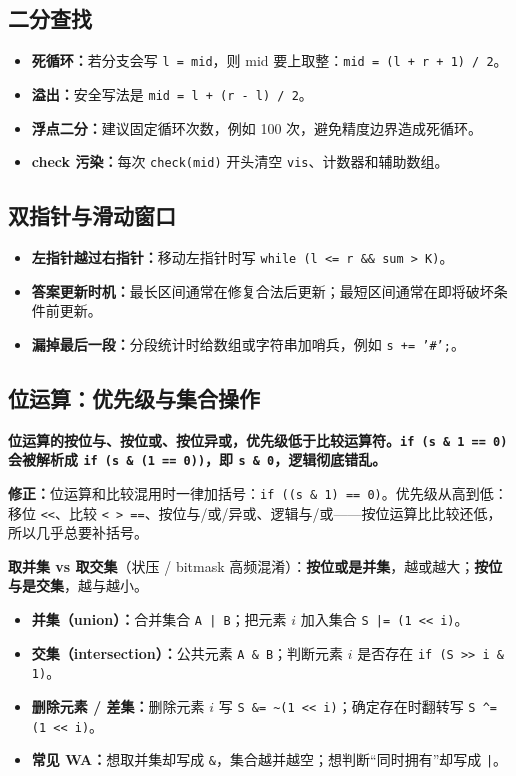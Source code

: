 \documentclass[UTF8,openany,oneside,zihao=-4]{ctexbook}
\newcommand{\risk}[1]{%
  \vspace{0.35em}
  \noindent\colorbox{softred}{%
    \parbox{\dimexpr\linewidth-2\fboxsep}{\textcolor{danger}{\textbf{#1}}}}%
  \vspace{0.35em}
}
\newcommand{\note}[1]{%
  \vspace{0.35em}
  \noindent\colorbox{softblue}{%
    \parbox{\dimexpr\linewidth-2\fboxsep}{\textcolor{ink}{#1}}}%
  \vspace{0.35em}
}
\newcommand{\fix}[1]{%
  \vspace{0.35em}
  \noindent\colorbox{softgreen}{%
    \parbox{\dimexpr\linewidth-2\fboxsep}{\textbf{修正：}#1}}%
  \vspace{0.35em}
}
\newcommand{\term}[1]{\textbf{\textcolor{accenttwo}{#1}}}
\begin{document}
\subsection{二分查找}

\begin{itemize}
  \item \textbf{死循环：}若分支会写 \lstinline!l = mid!，则 mid 要上取整：\lstinline!mid = (l + r + 1) / 2!。
  \item \textbf{溢出：}安全写法是 \lstinline!mid = l + (r - l) / 2!。
  \item \textbf{浮点二分：}建议固定循环次数，例如 100 次，避免精度边界造成死循环。
  \item \textbf{check 污染：}每次 \lstinline!check(mid)! 开头清空 \lstinline!vis!、计数器和辅助数组。
\end{itemize}

\subsection{双指针与滑动窗口}

\begin{itemize}
  \item \textbf{左指针越过右指针：}移动左指针时写 \texttt{while (l <= r \&\& sum > K)}。
  \item \textbf{答案更新时机：}最长区间通常在修复合法后更新；最短区间通常在即将破坏条件前更新。
  \item \textbf{漏掉最后一段：}分段统计时给数组或字符串加哨兵，例如 \texttt{s += '\#';}。
\end{itemize}

\subsection{位运算：优先级与集合操作}

\risk{位运算的按位与、按位或、按位异或，优先级\textbf{低于}比较运算符。\texttt{if (s \& 1 == 0)} 会被解析成 \texttt{if (s \& (1 == 0))}，即 \texttt{s \& 0}，逻辑彻底错乱。}

\fix{位运算和比较混用时一律加括号：\texttt{if ((s \& 1) == 0)}。优先级从高到低：移位 \texttt{<<}、比较 \texttt{< > ==}、按位与/或/异或、逻辑与/或——按位运算比比较还低，所以几乎总要补括号。}

\note{\textbf{取并集 vs 取交集}（状压 / bitmask 高频混淆）：\term{按位或是并集}，越或越大；\term{按位与是交集}，越与越小。}

\begin{itemize}
  \item \textbf{并集（union）：}合并集合 \lstinline!A | B!；把元素 $i$ 加入集合 \lstinline!S |= (1 << i)!。
  \item \textbf{交集（intersection）：}公共元素 \lstinline!A & B!；判断元素 $i$ 是否存在 \lstinline!if (S >> i & 1)!。
  \item \textbf{删除元素 / 差集：}删除元素 $i$ 写 \lstinline!S &= ~(1 << i)!；确定存在时翻转写 \lstinline!S ^= (1 << i)!。
  \item \textbf{常见 WA：}想取并集却写成 \lstinline!&!，集合越并越空；想判断“同时拥有”却写成 \lstinline!|!。
\end{itemize}
\end{document}
